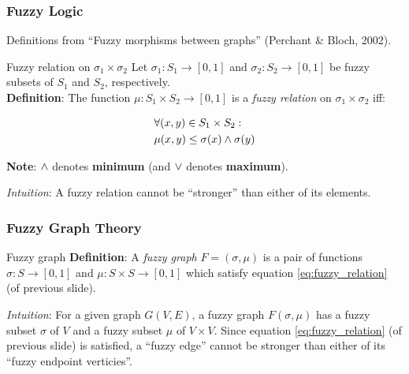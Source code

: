 \begin{frame}
	\frametitle{Fuzzy Logic}

	Definitions from ``Fuzzy morphisms between graphs'' {\footnotesize (Perchant \& Bloch, 2002)}.

	\begin{block}{Fuzzy relation on $\sigma_1 \times \sigma_2$}
		Let $\sigma_1: S_1 \rightarrow [0, 1]$ and $\sigma_2: S_2 \rightarrow [0, 1]$ be fuzzy subsets of $S_1$ and $S_2$, respectively. \\
		\textbf{Definition}: The function $\mu: S_1 \times S_2 \rightarrow [0, 1]$ is a \textit{fuzzy relation} on $\sigma_1 \times \sigma_2$ iff:

		\begin{equation}
			\begin{aligned}
				& \forall (x, y) \in S_1 \times S_2: \\
				& \mu(x, y) \le \sigma(x) \land \sigma(y)
			\end{aligned}
			\label{eq:fuzzy_relation}
		\end{equation}

		{\small \textbf{Note}: $\land$ denotes \textbf{minimum} (and $\lor$ denotes \textbf{maximum}).}

		\vspace*{2em}

		\textit{Intuition}: A fuzzy relation cannot be ``stronger'' than either of its elements.
	\end{block}
\end{frame}

\begin{frame}
	\frametitle{Fuzzy Graph Theory}

	\begin{block}{Fuzzy graph}
		\textbf{Definition}: A \textit{fuzzy graph} $F = (\sigma, \mu)$ is a pair of functions $\sigma: S \rightarrow [0, 1]$ and $\mu: S \times S \rightarrow [0, 1]$ which satisfy equation \ref{eq:fuzzy_relation} (of previous slide).

		\vspace*{2em}

		\textit{Intuition}: For a given graph $G(V, E)$, a fuzzy graph $F(\sigma, \mu)$ has a fuzzy subset $\sigma$ of $V$ and a fuzzy subset $\mu$ of $V \times V$. Since equation \ref{eq:fuzzy_relation} (of previous slide) is satisfied, a ``fuzzy edge'' cannot be stronger than either of its ``fuzzy endpoint verticies''.
	\end{block}
\end{frame}

